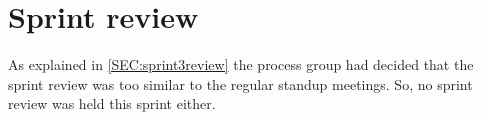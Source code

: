 \section{Sprint review}
As explained in \autoref{SEC:sprint3review} the process group had decided that the sprint review was too similar to the regular standup meetings.
So, no sprint review was held this sprint either.
